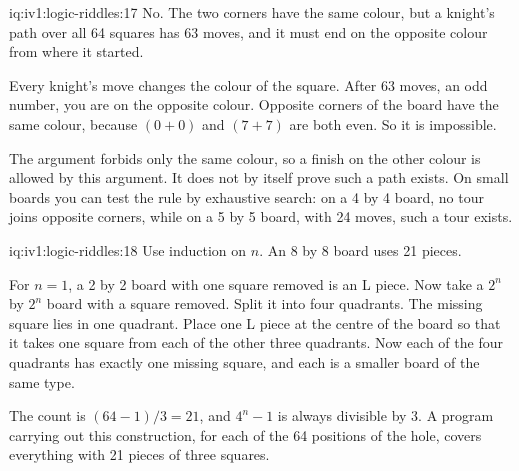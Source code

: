 \begin{solution}{iq:iv1:logic-riddles:17}
No. The two corners have the same colour, but a knight's path over all 64 squares has 63 moves, and it must end on the opposite colour from where it started.

Every knight's move changes the colour of the square. After 63 moves, an odd number, you are on the opposite colour. Opposite corners of the board have the same colour, because $(0 + 0)$ and $(7 + 7)$ are both even. So it is impossible.

The argument forbids only the same colour, so a finish on the other colour is allowed by this argument. It does not by itself prove such a path exists. On small boards you can test the rule by exhaustive search: on a 4 by 4 board, no tour joins opposite corners, while on a 5 by 5 board, with 24 moves, such a tour exists.

\end{solution}

\begin{solution}{iq:iv1:logic-riddles:18}
Use induction on $n$. An 8 by 8 board uses 21 pieces.

For $n = 1$, a 2 by 2 board with one square removed is an L piece. Now take a $2^n$ by $2^n$ board with a square removed. Split it into four quadrants. The missing square lies in one quadrant. Place one L piece at the centre of the board so that it takes one square from each of the other three quadrants. Now each of the four quadrants has exactly one missing square, and each is a smaller board of the same type.

The count is $(64 - 1)/3 = 21$, and $4^n - 1$ is always divisible by 3. A program carrying out this construction, for each of the 64 positions of the hole, covers everything with 21 pieces of three squares.

\end{solution}

